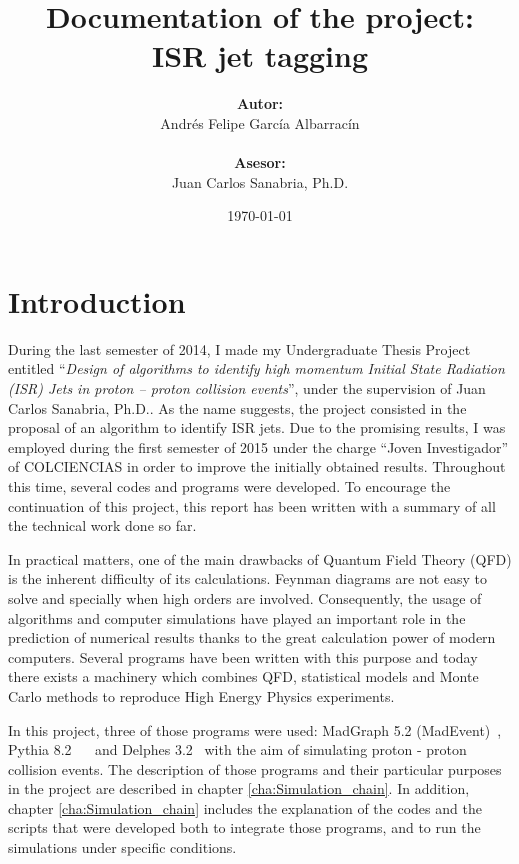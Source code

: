 \documentclass[12pt, oneside]{book}              %
\title{\bf Documentation of the project: \\ ISR jet tagging}
\author{\textbf{Autor:}\\ Andr\'es Felipe Garc\'ia Albarrac\'in \\ \\ \textbf{Asesor:} \\ Juan Carlos Sanabria, Ph.D.}
\date{\today}
\begin{document}
	\frontmatter                            %
	\maketitle                              %
	\tableofcontents                        %
	\mainmatter                             %

\chapter{Introduction}

During the last semester of 2014, I made my Undergraduate Thesis Project entitled 
``\textit{Design of algorithms to identify high momentum Initial State Radiation 
(ISR) Jets in proton – proton collision events}'', under the supervision of Juan
Carlos Sanabria, Ph.D.. As the name suggests, the project consisted in the proposal
of an algorithm to identify ISR jets. Due to the promising results, I was employed 
during the first semester of 2015 under the charge ``Joven Investigador'' of 
COLCIENCIAS in order to improve the initially obtained results. Throughout this
time, several codes and programs were developed. To encourage the continuation of
this project, this report has been written with a summary of all the technical 
work done so far.

In practical matters, one of the main drawbacks of Quantum Field Theory (QFD) is 
the inherent difficulty of its calculations. Feynman diagrams are not easy to solve
and specially when high orders are involved. Consequently, the usage of algorithms
and computer simulations have played an important role in the prediction of 
numerical results thanks to the great calculation power of modern computers. Several
programs have been written with this purpose and today there exists a machinery
which combines QFD, statistical models and Monte Carlo methods to reproduce High
Energy Physics experiments.

In this project, three of those programs were used: 
MadGraph 5.2 (MadEvent)~\cite{Alwall:2014hca}, Pythia 8.2~\cite{Sjostrand:2014zea} 
~\cite{Sjostrand:2006za} and Delphes 3.2~\cite{deFavereau:2013fsa} with the aim of 
simulating proton - proton collision events. The description of those programs and
their particular purposes in the project are described in chapter 
\ref{cha:Simulation_chain}. In addition, chapter \ref{cha:Simulation_chain}
includes the explanation of the codes and the scripts that were developed
both to integrate those programs, and to run the simulations under specific conditions.
\end{document}
